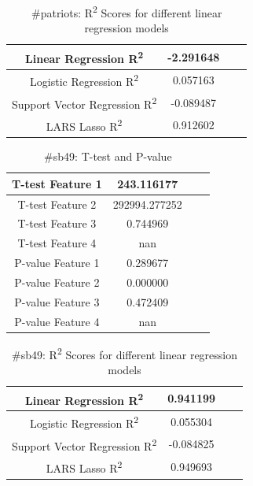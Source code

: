 \documentclass[12pt]{article}
\begin{document}
\begin{table}[H]
	\centering
	\begin{tabular}{| c | c | c | c |}
		\hline 
		Linear Regression R\textsuperscript2  & -2.291648 \\\hline
		Logistic Regression R\textsuperscript2  & 0.057163 \\\hline
		Support Vector Regression R\textsuperscript2  & -0.089487 \\\hline
		LARS Lasso R\textsuperscript2  & 0.912602 \\\hline
	\end{tabular} 
	\caption{\#patriots: R\textsuperscript2 Scores for different linear regression models}
	\label{part1:tab1}
\end{table} 

\begin{table}[H]
	\centering
	\begin{tabular}{| c | c | c | c |}
		\hline 
		T-test Feature 1 & 243.116177 \\\hline
		T-test Feature 2 & 292994.277252 \\\hline
		T-test Feature 3 & 0.744969 \\\hline 
		T-test Feature 4 & nan \\\hline
		P-value Feature 1 & 0.289677 \\\hline
		P-value Feature 2 & 0.000000 \\\hline
		P-value Feature 3 & 0.472409 \\\hline
		P-value Feature 4 & nan \\\hline
	\end{tabular} 
	\caption{\#sb49: T-test and P-value}
	\label{part1:tab1}
\end{table} 


\begin{table}[H]
	\centering
	\begin{tabular}{| c | c | c | c |}
		\hline 
		Linear Regression R\textsuperscript2  & 0.941199 \\\hline
		Logistic Regression R\textsuperscript2  & 0.055304 \\\hline
		Support Vector Regression R\textsuperscript2  & -0.084825 \\\hline
		LARS Lasso R\textsuperscript2  & 0.949693 \\\hline
	\end{tabular} 
	\caption{\#sb49: R\textsuperscript2 Scores for different linear regression models}
	\label{part1:tab1}
\end{table} 
\end{document}
